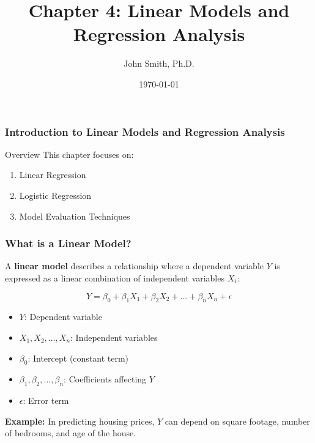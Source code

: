 \documentclass[aspectratio=169]{beamer}
\title[Chapter 4: Linear Models and Regression Analysis]{Chapter 4: Linear Models and Regression Analysis}
\author[J. Smith]{John Smith, Ph.D.}
\date{\today}
\begin{document}
\frame{\titlepage}

\begin{frame}[fragile]
    \frametitle{Introduction to Linear Models and Regression Analysis}
    \begin{block}{Overview}
        This chapter focuses on:
        \begin{enumerate}
            \item Linear Regression
            \item Logistic Regression
            \item Model Evaluation Techniques
        \end{enumerate}
    \end{block}
\end{frame}

\begin{frame}[fragile]
    \frametitle{What is a Linear Model?}
    A \textbf{linear model} describes a relationship where a dependent variable \(Y\) is expressed as a linear combination of independent variables \(X_i\):
    
    \begin{equation}
        Y = \beta_0 + \beta_1X_1 + \beta_2X_2 + \ldots + \beta_nX_n + \epsilon
    \end{equation}
    
    \begin{itemize}
        \item \(Y\): Dependent variable
        \item \(X_1, X_2, \ldots, X_n\): Independent variables
        \item \(\beta_0\): Intercept (constant term)
        \item \(\beta_1, \beta_2, \ldots, \beta_n\): Coefficients affecting \(Y\)
        \item \(\epsilon\): Error term
    \end{itemize} 

    \textbf{Example:} In predicting housing prices, \(Y\) can depend on square footage, number of bedrooms, and age of the house.
\end{frame}
\end{document}
